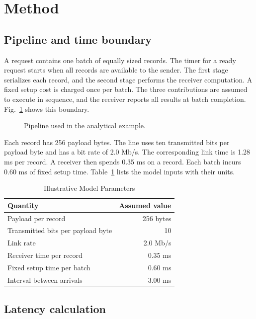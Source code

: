 \section{Method}

\subsection{Pipeline and time boundary}

A request contains one batch of equally sized records. The timer for a ready request starts when all records are available to the sender. The first stage serializes each record, and the second stage performs the receiver computation. A fixed setup cost is charged once per batch. The three contributions are assumed to execute in sequence, and the receiver reports all results at batch completion. Fig.~\ref{fig:pipeline} shows this boundary.

\begin{figure}[!t]
\centering

\caption{Pipeline used in the analytical example.}
\label{fig:pipeline}
\end{figure}

Each record has 256 payload bytes. The line uses ten transmitted bits per payload byte and has a bit rate of 2.0 Mb/s. The corresponding link time is 1.28 ms per record. A receiver then spends 0.35 ms on a record. Each batch incurs 0.60 ms of fixed setup time. Table~\ref{tab:parameters} lists the model inputs with their units.

\begin{table}[!t]
\caption{Illustrative Model Parameters}
\label{tab:parameters}
\centering
\small
\begin{tabular}{@{}lr@{}}
\toprule
Quantity & Assumed value\\
\midrule
Payload per record & 256 bytes\\
Transmitted bits per payload byte & 10\\
Link rate & 2.0 Mb/s\\
Receiver time per record & 0.35 ms\\
Fixed setup time per batch & 0.60 ms\\
Interval between arrivals & 3.00 ms\\
\bottomrule
\end{tabular}
\end{table}

\SampleColumnBreak

\subsection{Latency calculation}

